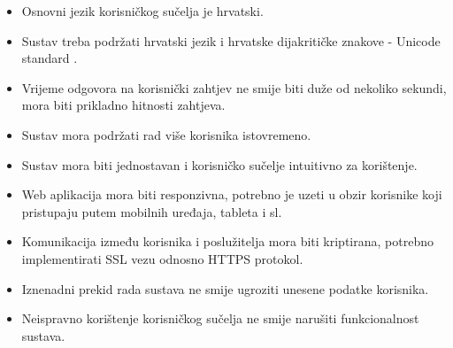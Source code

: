 \begin{itemize}
	\item Osnovni jezik korisničkog sučelja je hrvatski.
	\item Sustav treba podržati hrvatski jezik i hrvatske dijakritičke znakove - Unicode standard .
	\item Vrijeme odgovora na korisnički zahtjev ne smije biti duže od nekoliko sekundi, mora biti prikladno hitnosti zahtjeva.
	\item Sustav mora podržati rad više korisnika istovremeno.
	\item Sustav mora biti jednostavan i korisničko sučelje intuitivno za korištenje.
	\item Web aplikacija mora biti responzivna, potrebno je uzeti u obzir korisnike koji pristupaju putem mobilnih uređaja, tableta i sl.
	\item Komunikacija između korisnika i poslužitelja mora biti kriptirana, potrebno implementirati SSL vezu odnosno HTTPS protokol.
	\item Iznenadni prekid rada sustava ne smije ugroziti unesene podatke korisnika.
	\item Neispravno korištenje korisničkog sučelja ne smije narušiti funkcionalnost sustava.

\end{itemize}
